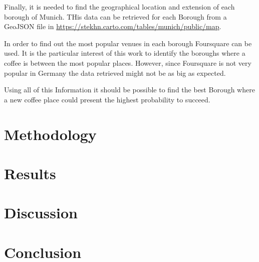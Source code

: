 \documentclass[]{report}
\begin{document}
Finally, it is needed to find the geographical location and extension of each borough of Munich. THis data can be retrieved for each Borough from a GeoJSON file in \url{https://stekhn.carto.com/tables/munich/public/map}.

In order to find out the most popular venues in each borough Foursquare can be used. It is the particular interest of this work to identify the boroughs where a coffee is between the most popular places. However, since Foursquare is not very popular in Germany the data retrieved might not be as big as expected.

Using all of this Information it should be possible to find the best Borough where a new coffee place could present the highest probability to succeed.

\section*{Methodology}


\section*{Results}


\section*{Discussion}


\section*{Conclusion}
\end{document}
